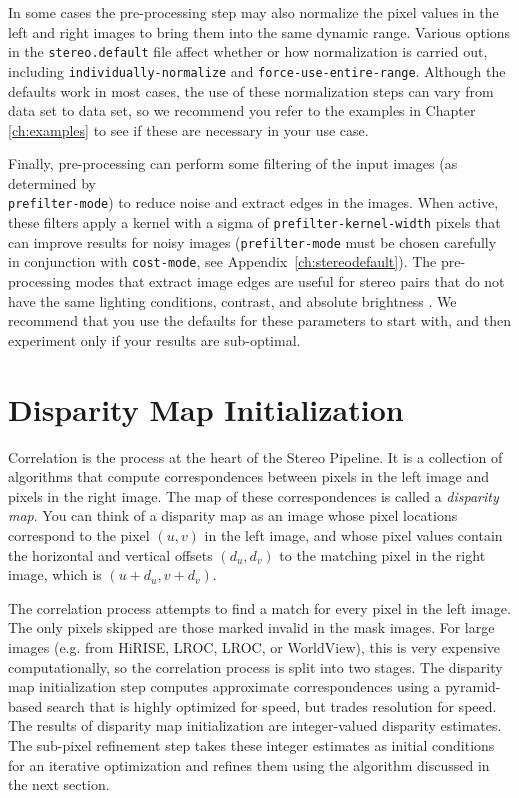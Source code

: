 In some cases the pre-processing step may also normalize the pixel
values in the left and right images to bring them into the same
dynamic range.  Various options in the {\tt stereo.default} file
affect whether or how normalization is carried out, including
\texttt{individually-normalize} and
\texttt{force-use-entire-range}.  Although the defaults work in
most cases, the use of these normalization steps can vary from data
set to data set, so we recommend you refer to the examples in Chapter
\ref{ch:examples} to see if these are necessary in your use case.

Finally, pre-processing can perform some filtering of the input
images (as determined by \\ \texttt{prefilter-mode}) to reduce noise
and extract edges in the images.  When active, these filters apply
a kernel with a sigma of \texttt{prefilter-kernel-width} pixels
that can improve results for noisy images (\texttt{prefilter-mode}
must be chosen carefully in conjunction with \texttt{cost-mode},
see Appendix~\ref{ch:stereodefault}).  The pre-processing modes
that extract image edges are useful for stereo pairs that do not
have the same lighting conditions, contrast, and absolute brightness
\citep{Nishihara84practical}.  We recommend that you use the defaults
for these parameters to start with, and then experiment only if
your results are sub-optimal.

\section{Disparity Map Initialization}
\label{d-sub}

Correlation is the process at the heart of the Stereo Pipeline.  It is
a collection of algorithms that compute correspondences between pixels
in the left image and pixels in the right image.  The map of these
correspondences is called a {\em disparity map}.  You can think of a
disparity map as an image whose pixel locations correspond to
the pixel $(u,v)$ in the left image, and whose pixel values
contain the horizontal and vertical offsets $(d_u, d_v)$ to the
matching pixel in the right image, which is $(u+d_u, v+d_v)$.

The correlation process attempts to find a match for every pixel in
the left image. The only pixels skipped are those marked invalid in
the mask images. For large images (e.g. from \ac{HiRISE}, \acl{LROC},
\acs{LROC}, or WorldView), this is very expensive computationally, so
the correlation process is split into two stages.  The disparity map
initialization step computes approximate correspondences using a
pyramid-based search that is highly optimized for speed, but trades
resolution for speed. The results of disparity map initialization are
integer-valued disparity estimates.  The sub-pixel refinement step
takes these integer estimates as initial conditions for an iterative
optimization and refines them using the algorithm discussed in the
next section.

